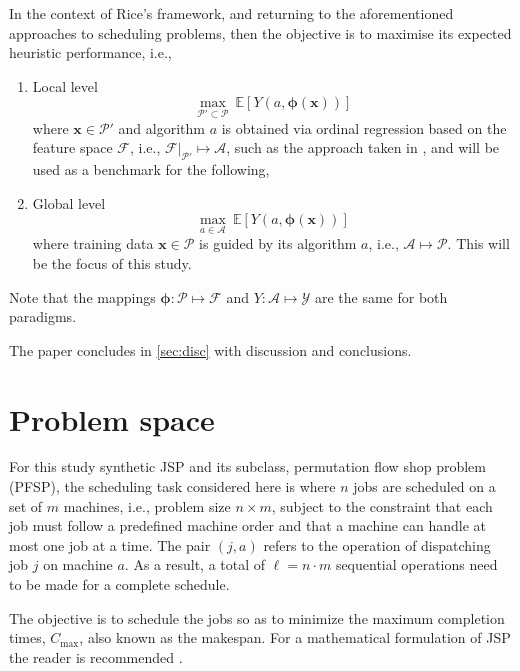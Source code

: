 \documentclass[graybox]{svmult}
\renewcommand{\vec}[1]{\mathbf{#1}}
\newcommand{\vphi}{{\boldsymbol{\phi}}}
\begin{document}
In the context of Rice's framework, and returning to the aforementioned 
approaches to scheduling problems, then the objective is to maximise its 
expected heuristic performance, i.e.,
\begin{enumerate} 
	\item Local level 
	      \begin{equation}
	      	\max_{\mathcal{P}'\subset\mathcal{P}}~\mathbb{E}\left[Y\left(a,\vphi(\vec{x})\right)\right]
	      \end{equation}where $\vec{x}\in\mathcal{P}'$ and algorithm $a$ is obtained via 
	      ordinal regression based on the feature space $\mathcal{F}$, i.e., 
	      $\mathcal{F}|_{\mathcal{P}'}\mapsto\mathcal{A}$, such as the approach taken in 
	      \cite{InRu11a}, and  will be used as a benchmark for the following,  
	\item  Global level
	      \begin{equation}
	      	\max_{a\in\mathcal{A}}~\mathbb{E}\left[Y\left(a,\vphi(\vec{x})\right)\right]
	      \end{equation}
	      where training data $\vec{x}\in\mathcal{P}$ is guided by its algorithm $a$, 
	      i.e., $\mathcal{A}\mapsto\mathcal{P}$. This will be the focus of this study.
\end{enumerate}
Note that the mappings $\vphi:\mathcal{P}\mapsto\mathcal{F}$ and 
$Y:\mathcal{A}\mapsto\mathcal{Y}$ are the same for both paradigms.

The paper concludes in \cref{sec:disc} with discussion and conclusions.


\section{Problem space}\label{sec:data}
For this study synthetic JSP and its subclass, permutation flow shop problem 
(PFSP), the scheduling task considered here is where $n$ jobs are scheduled on 
a set of $m$ machines, i.e., problem size $n\times m$, subject to the 
constraint that each job must follow a predefined machine order and that a 
machine can handle at most one job at a time. The pair $(j,a)$ refers to the 
operation of dispatching job $j$ on machine $a$. As a result, a total of $\ell 
= n\cdot m$ sequential operations need to be made for a complete schedule.

The objective is to schedule the jobs so as to minimize the maximum completion 
times, $C_{\max}$, also known as the makespan.  For a mathematical formulation 
of JSP the reader is recommended \cite{InRu11a}. 
\end{document}
